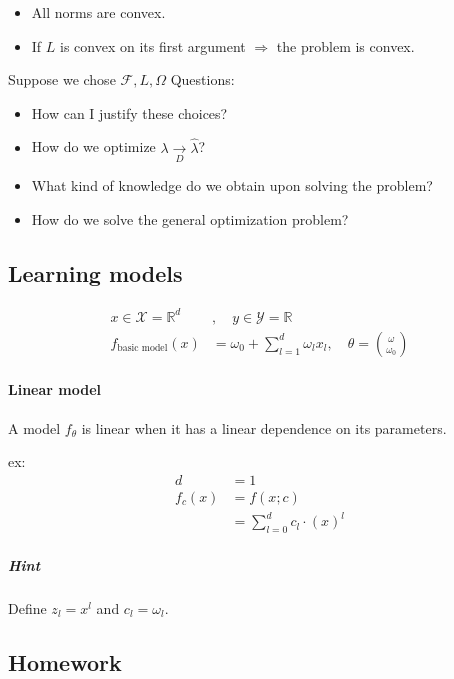 \begin{itemize}
	\item All norms are convex.
	\item If $L$ is convex on its first argument $\Rightarrow$ the problem is convex.
\end{itemize}

Suppose we chose $\mathcal{F}, L, \Omega$ Questions:

\begin{itemize}
	\item How can I justify these choices?
	\item How do we optimize $\lambda \xrightarrow[D]{} \hat\lambda$?
	\item What kind of knowledge do we obtain upon solving the problem?
	\item How do we solve the general optimization problem?
\end{itemize}

\subsection{Learning models} %

\begin{align*}
	x \in \mathcal{X} = \mathbb{R}^d & , \quad y \in \mathcal{Y} = \mathbb{R}                                            \\
	f_{\text{basic model}}(x)        & = \omega_0 + \sum_{l = 1}^d \omega_l x_l, \quad \theta = \binom{\omega}{\omega_0}
\end{align*}

\paragraph{Linear model}

A model $f_\theta$ is linear when it has a linear dependence on its parameters.

ex:
\begin{align*}
	d      & = 1                            \\
	f_c(x) & = f(x;c)                       \\
	       & = \sum_{l=0}^d c_l \cdot (x)^l
\end{align*}

\subparagraph{Hint} Define $z_l = x^l$ and $c_l = \omega_l$.

\subsection{Homework}

